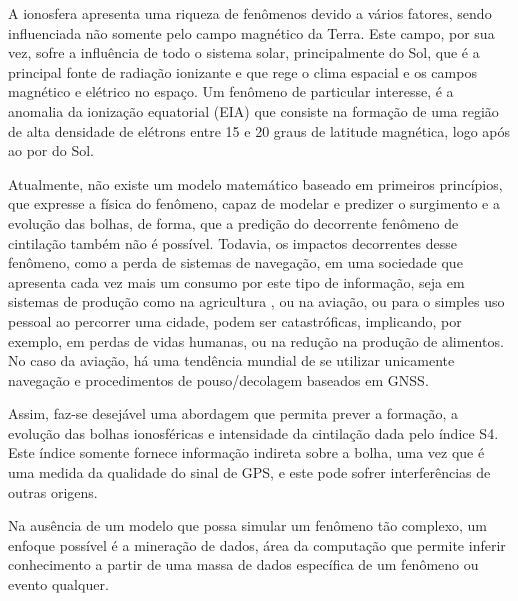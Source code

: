 A ionosfera apresenta uma riqueza de fenômenos devido a vários fatores, sendo influenciada não somente pelo campo magnético da Terra. Este campo, por sua vez, sofre a influência de todo o sistema solar, principalmente do Sol, que é a principal fonte de radiação ionizante e que rege o clima espacial e os campos magnético e elétrico no espaço. Um fenômeno de particular interesse, é a anomalia da ionização equatorial (EIA) que consiste na formação de uma região de alta densidade de elétrons entre 15 e 20 graus de latitude magnética, logo após ao por do Sol.

Atualmente, não existe um modelo matemático baseado em primeiros princípios, que expresse a física do fenômeno, capaz de modelar e predizer o surgimento e a evolução das bolhas, de forma, que a predição do decorrente fenômeno de cintilação também não é possível. Todavia, os impactos decorrentes desse fenômeno, como a perda de sistemas de navegação, em uma sociedade que apresenta cada vez mais um consumo por este tipo de informação, seja em sistemas de produção como na agricultura \cite{STAFFORD:2000}, ou na aviação, ou para o simples uso pessoal ao percorrer uma cidade, podem ser catastróficas, implicando, por exemplo, em perdas de vidas humanas, ou na redução na produção de alimentos. No caso da aviação, há uma tendência mundial de se utilizar unicamente navegação e procedimentos de pouso/decolagem baseados em GNSS.

Assim, faz-se desejável uma abordagem que permita prever a formação, a evolução das bolhas ionosféricas e intensidade da cintilação dada pelo índice S4. Este índice somente fornece informação indireta sobre a bolha, uma vez que é uma medida da qualidade do sinal de GPS, e este pode sofrer interferências de outras origens.

Na ausência de um modelo que possa simular um fenômeno tão complexo, um enfoque possível é a mineração de dados, área da computação que permite inferir conhecimento a partir de uma massa de dados específica de um fenômeno ou evento qualquer.
